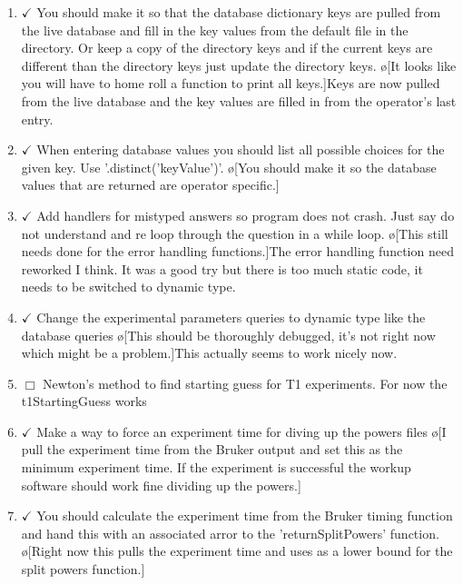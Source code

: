 \documentclass[10pt]{book}
\begin{document}
\begin{enumerate}
    \item $\checkmark$ You should make it so that the database dictionary keys are pulled from the live database and fill in the key values from the default file in the directory. Or keep a copy of the directory keys and if the current keys are different than the directory keys just update the directory keys. \o[It looks like you will have to home roll a function to print all keys.]{Keys are now pulled from the live database and the key values are filled in from the operator's last entry.}
    \item $\checkmark$ When entering database values you should list all possible choices for the given key. Use '.distinct('keyValue')'. \o[You should make it so the database values that are returned are operator specific.]{}
    \item $\checkmark$ Add handlers for mistyped answers so program does not crash. Just say do not understand and re loop through the question in a while loop. \o[This still needs done for the error handling functions.]{The error handling function need reworked I think. It was a good try but there is too much static code, it needs to be switched to dynamic type.}
    \item $\checkmark$ Change the experimental parameters queries to dynamic type like the database queries \o[This should be thoroughly debugged, it's not right now which might be a problem.]{This actually seems to work nicely now.}
    \item $\Box$ Newton's method to find starting guess for T1 experiments. For now the t1StartingGuess works 
    \item $\checkmark$ Make a way to force an experiment time for diving up the powers files \o[I pull the experiment time from the Bruker output and set this as the minimum experiment time. If the experiment is successful the workup software should work fine dividing up the powers.]{}
    \item $\checkmark$ You should calculate the experiment time from the Bruker timing function and hand this with an associated arror to the 'returnSplitPowers' function. \o[Right now this pulls the experiment time and uses as a lower bound for the split powers function.]{}
\end{enumerate}
\end{document}
